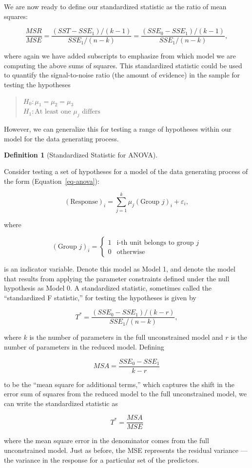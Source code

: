 \documentclass[
  letterpaper,
  DIV=11,
  numbers=noendperiod]{scrreprt}
\theoremstyle{plain}
\theoremstyle{definition}
\theoremstyle{definition}
\newtheorem{definition}{Definition}[chapter]
\theoremstyle{remark}
\begin{document}
We are now ready to define our standardized statistic as the ratio of
mean squares:

\[\frac{MSR}{MSE} = \frac{\left(SST - SSE_1\right)/(k - 1)}{SSE_1 / (n - k)} = \frac{\left(SSE_0 - SSE_1\right)/(k - 1)}{SSE_1 / (n - k)},\]

where again we have added subscripts to emphasize from which model we
are computing the above sums of squares. This standardized statistic
could be used to quantify the signal-to-noise ratio (the amount of
evidence) in the sample for testing the hypotheses

\begin{quote}
\(H_0: \mu_1 = \mu_2 = \mu_3\)\\
\(H_1: \text{At least one } \mu_j \text{ differs}\)
\end{quote}

However, we can generalize this for testing a range of hypotheses within
our model for the data generating process.

\begin{definition}[Standardized Statistic for
ANOVA]\protect\hypertarget{def-anova-f}{}\label{def-anova-f}

Consider testing a set of hypotheses for a model of the data generating
process of the form (Equation~\ref{eq-anova}):

\[(\text{Response})_i = \sum_{j=1}^{k} \mu_j(\text{Group } j)_i + \varepsilon_i,\]

where

\[(\text{Group } j)_i = \begin{cases} 1 & \text{i-th unit belongs to group } j \\ 0 & \text{otherwise} \end{cases}\]

is an indicator variable. Denote this model as Model 1, and denote the
model that results from applying the parameter constraints defined under
the null hypothesis as Model 0. A standardized statistic, sometimes
called the ``standardized F statistic,'' for testing the hypotheses is
given by

\[T^* = \frac{\left(SSE_0 - SSE_1\right) / (k - r)}{SSE_1 / (n - k)},\]

where \(k\) is the number of parameters in the full unconstrained model
and \(r\) is the number of parameters in the reduced model. Defining

\[MSA = \frac{SSE_0 - SSE_1}{k - r}\]

to be the ``mean square for additional terms,'' which captures the shift
in the error sum of squares from the reduced model to the full
unconstrained model, we can write the standardized statistic as

\[T^* = \frac{MSA}{MSE}\]

where the mean square error in the denominator comes from the full
unconstrained model. Just as before, the MSE represents the residual
variance --- the variance in the response for a particular set of the
predictors.

\end{definition}
\end{document}
